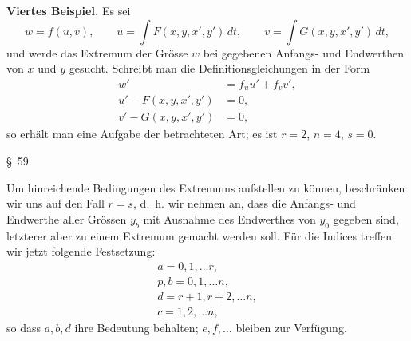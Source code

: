 \documentclass[11pt,a4paper,leqno]{article}
\begin{document}
\noindent\textbf{Viertes Beispiel.} Es sei
\[
w=f(u,v),\qquad
u=\int F(x,y,x',y')\,dt,\qquad
v=\int G(x,y,x',y')\,dt,
\]
und werde das Extremum der Grösse $w$ bei gegebenen Anfangs- und Endwerthen von $x$ und $y$ gesucht. Schreibt man die Definitionsgleichungen in der Form
\[
\begin{aligned}
w'&=f_u u'+f_v v',\\
u'-F(x,y,x',y')&=0,\\
v'-G(x,y,x',y')&=0,
\end{aligned}
\]
so erhält man eine Aufgabe der betrachteten Art; es ist $r=2$, $n=4$, $s=0$.


\begin{center}
{\large \S~59.}
\end{center}

Um hinreichende Bedingungen des Extremums aufstellen zu können, beschränken wir uns auf den Fall $r=s$, d.~h. wir nehmen an, dass die Anfangs- und Endwerthe aller Grössen $y_b$ mit Ausnahme des Endwerthes von $y_0$ gegeben sind, letzterer aber zu einem Extremum gemacht werden soll. Für die Indices treffen wir jetzt folgende Festsetzung:
\[
\begin{gathered}
a=0,1,\ldots r,\\
p,b=0,1,\ldots n,\\
d=r+1,r+2,\ldots n,\\
c=1,2,\ldots n,
\end{gathered}
\]
so dass $a,b,d$ ihre Bedeutung behalten; $e,f,\ldots$ bleiben zur Verfügung.
\end{document}
